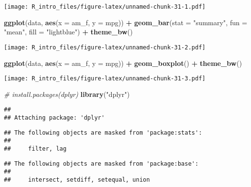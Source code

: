 \documentclass[
  a4paper,
]{article}
\newenvironment{Shaded}{\begin{snugshade}}{\end{snugshade}}
\newcommand{\AttributeTok}[1]{\textcolor[rgb]{0.13,0.29,0.53}{#1}}
\newcommand{\CommentTok}[1]{\textcolor[rgb]{0.56,0.35,0.01}{\textit{#1}}}
\newcommand{\FunctionTok}[1]{\textcolor[rgb]{0.13,0.29,0.53}{\textbf{#1}}}
\newcommand{\NormalTok}[1]{#1}
\newcommand{\SpecialCharTok}[1]{\textcolor[rgb]{0.81,0.36,0.00}{\textbf{#1}}}
\newcommand{\StringTok}[1]{\textcolor[rgb]{0.31,0.60,0.02}{#1}}
\begin{document}
\texttt{[image: R\_intro\_files/figure-latex/unnamed-chunk-31-1.pdf]}

\begin{Shaded}
\begin{Highlighting}[]
\FunctionTok{ggplot}\NormalTok{(data, }\FunctionTok{aes}\NormalTok{(}\AttributeTok{x =}\NormalTok{ am\_f, }\AttributeTok{y =}\NormalTok{ mpg)) }\SpecialCharTok{+} \FunctionTok{geom\_bar}\NormalTok{(}\AttributeTok{stat =} \StringTok{"summary"}\NormalTok{,}
    \AttributeTok{fun =} \StringTok{"mean"}\NormalTok{, }\AttributeTok{fill =} \StringTok{"lightblue"}\NormalTok{) }\SpecialCharTok{+} \FunctionTok{theme\_bw}\NormalTok{()}
\end{Highlighting}
\end{Shaded}

\texttt{[image: R\_intro\_files/figure-latex/unnamed-chunk-31-2.pdf]}

\begin{Shaded}
\begin{Highlighting}[]
\FunctionTok{ggplot}\NormalTok{(data, }\FunctionTok{aes}\NormalTok{(}\AttributeTok{x =}\NormalTok{ am\_f, }\AttributeTok{y =}\NormalTok{ mpg)) }\SpecialCharTok{+} \FunctionTok{geom\_boxplot}\NormalTok{() }\SpecialCharTok{+} \FunctionTok{theme\_bw}\NormalTok{()}
\end{Highlighting}
\end{Shaded}

\texttt{[image: R\_intro\_files/figure-latex/unnamed-chunk-31-3.pdf]}

\begin{Shaded}
\begin{Highlighting}[]
\CommentTok{\# install.packages(\textquotesingle{}dplyr\textquotesingle{})}
\FunctionTok{library}\NormalTok{(}\StringTok{"dplyr"}\NormalTok{)}
\end{Highlighting}
\end{Shaded}

\begin{verbatim}
## 
## Attaching package: 'dplyr'
\end{verbatim}

\begin{verbatim}
## The following objects are masked from 'package:stats':
## 
##     filter, lag
\end{verbatim}

\begin{verbatim}
## The following objects are masked from 'package:base':
## 
##     intersect, setdiff, setequal, union
\end{verbatim}
\end{document}
